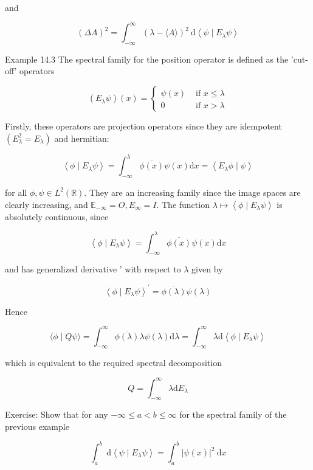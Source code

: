 \documentclass[10pt]{article}
\begin{document}
and

$$
(\Delta A)^{2}=\int_{-\infty}^{\infty}(\lambda-\langle A\rangle)^{2} \mathrm{~d}\left\langle\psi \mid E_{\lambda} \psi\right\rangle
$$

Example 14.3 The spectral family for the position operator is defined as the 'cut-off' operators

$$
\left(E_{\lambda} \psi\right)(x)= \begin{cases}\psi(x) & \text { if } x \leq \lambda \\ 0 & \text { if } x>\lambda\end{cases}
$$

Firstly, these operators are projection operators since they are idempotent $\left(E_{\lambda}^{2}=E_{\lambda}\right)$ and hermitian:

$$
\left\langle\phi \mid E_{\lambda} \psi\right\rangle=\int_{-\infty}^{\lambda} \overline{\phi(x)} \psi(x) \mathrm{d} x=\left\langle E_{\lambda} \phi \mid \psi\right\rangle
$$

for all $\phi, \psi \in L^{2}(\mathbb{R})$. They are an increasing family since the image spaces are clearly increasing, and $\mathbb{E}_{-\infty}=O, E_{\infty}=I$. The function $\lambda \mapsto\left\langle\phi \mid E_{\lambda} \psi\right\rangle$ is absolutely continuous, since

$$
\left\langle\phi \mid E_{\lambda} \psi\right\rangle=\int_{-\infty}^{\lambda} \overline{\phi(x)} \psi(x) \mathrm{d} x
$$

and has generalized derivative ' with respect to $\lambda$ given by

$$
\left\langle\phi \mid E_{\lambda} \psi\right\rangle^{\prime}=\overline{\phi(\lambda)} \psi(\lambda)
$$

Hence

$$
\langle\phi \mid Q \psi\rangle=\int_{-\infty}^{\infty} \overline{\phi(\lambda)} \lambda \psi(\lambda) \mathrm{d} \lambda=\int_{-\infty}^{\infty} \lambda \mathrm{d}\left\langle\phi \mid E_{\lambda} \psi\right\rangle
$$

which is equivalent to the required spectral decomposition

$$
Q=\int_{-\infty}^{\infty} \lambda \mathrm{d} E_{\lambda}
$$

Exercise: Show that for any $-\infty \leq a<b \leq \infty$ for the spectral family of the previous example

$$
\int_{a}^{b} \mathrm{~d}\left\langle\psi \mid E_{\lambda} \psi\right\rangle=\int_{a}^{b}|\psi(x)|^{2} \mathrm{~d} x
$$
\end{document}
